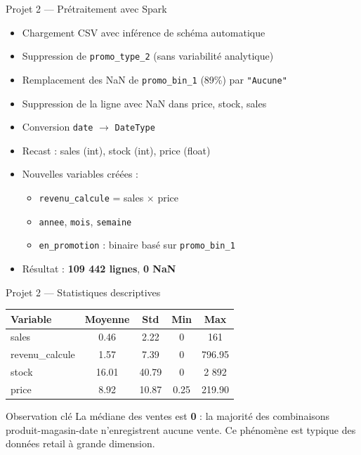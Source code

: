 \documentclass{beamer}
\begin{document}
\begin{frame}{Projet 2 --- Prétraitement avec Spark}
  \begin{itemize}
    \item Chargement CSV avec inférence de schéma automatique
    \item Suppression de \texttt{promo\_type\_2} (sans variabilité analytique)
    \item Remplacement des NaN de \texttt{promo\_bin\_1} (89\%) par \texttt{"Aucune"}
    \item Suppression de la ligne avec NaN dans price, stock, sales
    \item Conversion \texttt{date} $\rightarrow$ \texttt{DateType}
    \item Recast : sales (int), stock (int), price (float)
    \item Nouvelles variables créées :
      \begin{itemize}
        \item \texttt{revenu\_calcule} = sales $\times$ price
        \item \texttt{annee}, \texttt{mois}, \texttt{semaine}
        \item \texttt{en\_promotion} : binaire basé sur \texttt{promo\_bin\_1}
      \end{itemize}
    \item Résultat : \textbf{109 442 lignes}, \textbf{0 NaN}
  \end{itemize}
\end{frame}

\begin{frame}{Projet 2 --- Statistiques descriptives}
  \begin{tabular}{lcccc}
    \toprule
    Variable & Moyenne & Std & Min & Max \\
    \midrule
    sales & 0.46 & 2.22 & 0 & 161 \\
    revenu\_calcule & 1.57 & 7.39 & 0 & 796.95 \\
    stock & 16.01 & 40.79 & 0 & 2 892 \\
    price & 8.92 & 10.87 & 0.25 & 219.90 \\
    \bottomrule
  \end{tabular}

  \vspace{0.4cm}
  \begin{alertblock}{Observation clé}
    La médiane des ventes est \textbf{0} : la majorité des combinaisons
    produit-magasin-date n'enregistrent aucune vente.
    Ce phénomène est typique des données retail à grande dimension.
  \end{alertblock}
\end{frame}
\end{document}
